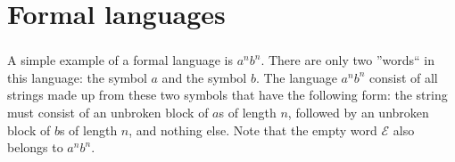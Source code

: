 \section{Formal languages}

\begin{frame}
	\frametitle{\insertsection}
	
	A simple example of a formal language is \(a^nb^n\). There are only two ''words`` in this language: the symbol \(a\) and the symbol \(b\).
	The language \(a^nb^n\) consist of all strings made up from these two symbols that have the following form: the string must consist of an unbroken block of \(a\)s of length \(n\), followed by an unbroken block of \(b\)s of length \(n\), and nothing else. Note that the empty word \(\mathcal{E} \) also belongs to \(a^nb^n \).
	
	
\end{frame}

